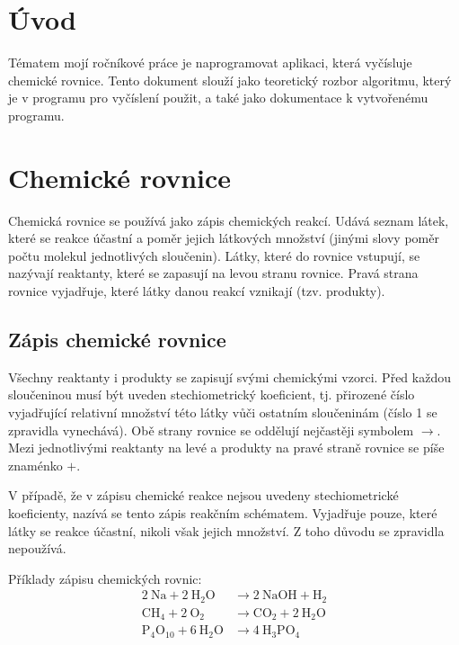 \documentclass[12pt,a4paper]{report}
\newcommand{\s}{$ \rightarrow $}
\newcommand{\n}[1]{\mbox{#1}}
\newcommand{\sipka}{\rightarrow}
\begin{document}


\tableofcontents

\chapter{Úvod}
Tématem mojí ročníkové práce je naprogramovat aplikaci, která vyčísluje chemické rovnice. Tento dokument slouží jako teoretický rozbor algoritmu, který je v programu pro vyčíslení použit, a také jako dokumentace k vytvořenému programu.

\chapter{Chemické rovnice}
Chemická rovnice se používá jako zápis chemických reakcí. Udává seznam látek, které se reakce účastní a poměr jejich látkových množství (jinými slovy poměr počtu molekul jednotlivých sloučenin). Látky, které do rovnice vstupují, se nazývají reaktanty, které se zapasují na levou stranu rovnice. Pravá strana rovnice vyjadřuje, které látky danou reakcí vznikají (tzv. produkty).

\section{Zápis chemické rovnice}
Všechny reaktanty i produkty se zapisují svými chemickými vzorci. Před každou sloučeninou musí být uveden stechiometrický koeficient, tj. přirozené číslo vyjadřující relativní množství této látky vůči ostatním sloučeninám (číslo 1 se zpravidla vynechává). Obě strany rovnice se oddělují nejčastěji symbolem \s. Mezi jednotlivými reaktanty na levé a produkty na pravé straně rovnice se píše znaménko $ + $.

V případě, že v zápisu chemické reakce nejsou uvedeny stechiometrické koeficienty, nazívá se tento zápis reakčním schématem. Vyjadřuje pouze, které látky se reakce účastní, nikoli však jejich množství. Z toho důvodu se zpravidla nepoužívá.

Příklady zápisu chemických rovnic:
\begin{align*}
 	2~\n{Na} + 2~\n{H}_2\n{O} &\sipka 2~\n{NaOH}+\n{H}_2\\
 	\n{CH}_4 + 2~\n{O}_2 &\sipka \n{CO}_2 + 2~\n{H}_2\n{O}\\
 	\n{P}_4\n{O}_{10} + 6~\n{H}_2\n{O} &\sipka 4~\n{H}_3\n{PO}_4
\end{align*}
\end{document}
